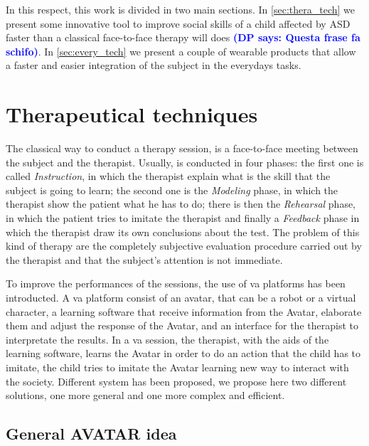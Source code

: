 \documentclass[12pt,journal,draftclsnofoot,onecolumn]{IEEEtran}
\newcommand{\DP}[1]{\textcolor{blue}{\textbf{(DP says: #1)}}}
\begin{document}
In this respect, this work is divided in two main sections. In \autoref{sec:thera_tech} we present some innovative tool to improve social skills of a child affected by ASD faster than a classical face-to-face therapy will does \DP{Questa frase fa schifo}.
In \autoref{sec:every_tech} we present a couple of wearable products that allow a faster and easier integration of the subject in the everydays tasks.

\section{Therapeutical techniques}
\label{sec:thera_tech}

The classical way to conduct a therapy session, is a face-to-face meeting between the subject and the therapist.
Usually, is conducted in four phases: the first one is called \textit{Instruction}, in which the therapist explain what is the skill that the subject is going to learn; the second one is the \textit{Modeling} phase, in which the therapist show the patient what he has to do; there is then the \textit{Rehearsal} phase, in which the patient tries to imitate the therapist and finally a \textit{Feedback} phase in which the therapist draw its own conclusions about the test.
The problem of this kind of therapy are the completely subjective evaluation procedure carried out by the therapist and that the subject's attention is not immediate.

To improve the performances of the sessions, the use of \gls{va} platforms has been introducted.
A \gls{va} platform consist of an avatar, that can be a robot or a virtual character, a learning software that receive information from the Avatar, elaborate them and adjust the response of the Avatar, and an interface for the therapist to interpretate the results.
In a \gls{va} session, the therapist, with the aids of the learning software, learns the Avatar in order to do an action that the child has to imitate, the child tries to imitate the Avatar learning new way to interact with the society.
Different system has been proposed, we propose here two different solutions, one more general and one more complex and efficient.

\subsection{General AVATAR idea}
\label{sec:avatar_general}
\end{document}
